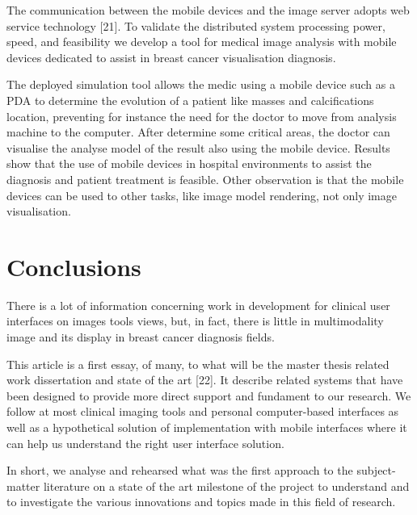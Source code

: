 The communication between the mobile devices and the image server adopts web service technology [21]. To validate the distributed system processing power, speed, and feasibility we develop a tool for medical image analysis with mobile devices dedicated to assist in breast cancer visualisation diagnosis.

The deployed simulation tool allows the medic using a mobile device such as a PDA to determine the evolution of a patient like masses and calcifications location, preventing for instance the need for the doctor to move from analysis machine to the computer. After determine some critical areas, the doctor can visualise the analyse model of the result also using the mobile device. Results show that the use of mobile devices in hospital environments to assist the diagnosis and patient treatment is feasible. Other observation is that the mobile devices can be used to other tasks, like image model rendering, not only image visualisation.

\section{Conclusions}

There is a lot of information concerning work in development for clinical user interfaces on images tools views, but, in fact, there is little in multimodality image and its display in breast cancer diagnosis fields.

This article is a first essay, of many, to what will be the master thesis related work dissertation and state of the art [22]. It describe related systems that have been designed to provide more direct support and fundament to our research. We follow at most clinical imaging tools and personal computer-based interfaces as well as a hypothetical solution of implementation with mobile interfaces where it can help us understand the right user interface solution.

In short, we analyse and rehearsed what was the first approach to the subject-matter literature on a state of the art milestone of the project to understand and to investigate the various innovations and topics made in this field of research.

\clearpage

